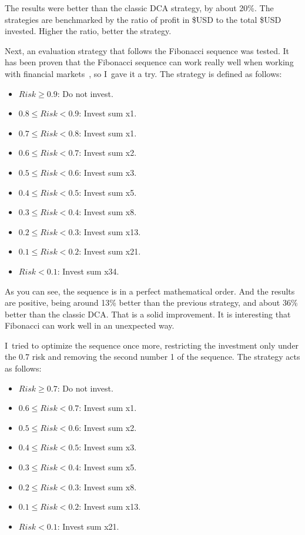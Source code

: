 The results were better than the classic DCA strategy, by about 20\%. The strategies are benchmarked by the ratio of profit in \$USD to the total \$USD invested. Higher the ratio, better the strategy.

Next, an evaluation strategy that follows the Fibonacci sequence was tested. It has been proven that the Fibonacci sequence can work really well when working with financial markets~\cite{investopedia:fibonacci}, so I~gave it a try. The strategy is defined as follows:
\begin{itemize}
    \item $Risk \ge  0.9$: Do not invest.
    \item $0.8 \le Risk < 0.9$: Invest sum x1.
    \item $0.7 \le Risk < 0.8$: Invest sum x1.
    \item $0.6 \le Risk < 0.7$: Invest sum x2.
    \item $0.5 \le Risk < 0.6$: Invest sum x3.
    \item $0.4 \le Risk < 0.5$: Invest sum x5.
    \item $0.3 \le Risk < 0.4$: Invest sum x8.
    \item $0.2 \le Risk < 0.3$: Invest sum x13.
    \item $0.1 \le Risk < 0.2$: Invest sum x21.
    \item $Risk < 0.1$: Invest sum x34.
\end{itemize}

As you can see, the sequence is in a perfect mathematical order. And the results are positive, being around 13\% better than the previous strategy, and about 36\% better than the classic DCA. That is a solid improvement. It is interesting that Fibonacci can work well in an unexpected way.

I~tried to optimize the sequence once more, restricting the investment only under the 0.7 risk and removing the second number 1 of the sequence. The strategy acts as follows:
\begin{itemize}
    \item $Risk \ge  0.7$: Do not invest.
    \item $0.6 \le Risk < 0.7$: Invest sum x1.
    \item $0.5 \le Risk < 0.6$: Invest sum x2.
    \item $0.4 \le Risk < 0.5$: Invest sum x3.
    \item $0.3 \le Risk < 0.4$: Invest sum x5.
    \item $0.2 \le Risk < 0.3$: Invest sum x8.
    \item $0.1 \le Risk < 0.2$: Invest sum x13.
    \item $Risk < 0.1$: Invest sum x21.
\end{itemize}

